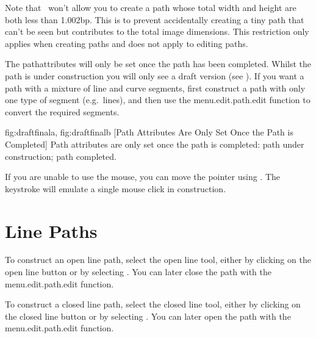 Note that \FlowframTk\ won't allow you to create a \gls{path} whose
total width and height are both less than 1.002\gls{bp}. This is to
prevent accidentally creating a tiny path that can't be seen but
contributes to the total image dimensions. This restriction only
applies when creating \glspl*{path} and does not apply to editing
paths.

The \gls{pathattributes} will only be set
once the \gls{path} has been completed. Whilst the
\gls{path} is under construction you will
only see a draft version (see ).
If you want a \gls{path} with a mixture of line and curve
segments, first construct a \gls{path} with only one
type of segment (e.g.\ lines), and then use the
\gls{menu.edit.path.edit} function to convert
the required segments.

{
 {fig:draftfinala}{}{},
 {fig:draftfinalb}{}{}
}
[Path Attributes Are Only Set Once the Path is Completed]
{Path attributes are only set once the path is completed:
 path under construction;
 path completed.}

If you are unable to use the mouse, you can move the pointer using
. The keystroke
 will emulate a single mouse
click in \gls{construction}.


\section{Line Paths}\label{sec:newlinepath}


To construct an open line \gls{path}, select the open line tool,
either by clicking on the open line button or by selecting
. You can later close the \gls{path}
with the \gls{menu.edit.path.edit} function.


To construct a closed line \gls{path}, select the closed line tool,
either by clicking on the closed line button or by selecting
. You can later open the \gls{path}
with the \gls{menu.edit.path.edit} function.

